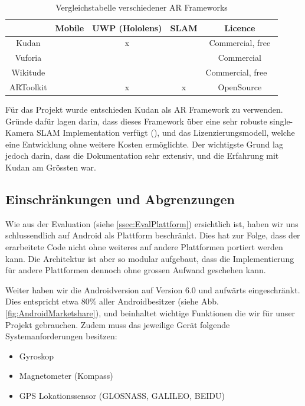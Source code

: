 \documentclass[a4paper]{scrreprt}
\begin{document}
\begin{table}[h!]
	\center
	\begin{tabular}{|c|c|c|c|c|}
		\hline 
		& \textbf{Mobile} & \textbf{UWP (Hololens)} & \textbf{SLAM} & \textbf{Licence} \\ 
		\hline 
		Kudan & \checkmark & x & \checkmark & Commercial, free \\ 
		\hline 
		Vuforia & \checkmark & \checkmark & \checkmark & Commercial \\ 
		\hline 
		Wikitude & \checkmark & \checkmark & \checkmark & Commercial, free \ \\ 
		\hline 
		ARToolkit & \checkmark & x & x & OpenSource \\ 
		\hline 
	\end{tabular}
	\caption{Vergleichstabelle verschiedener AR Frameworks}
\end{table}


Für das Projekt wurde entschieden Kudan als AR Framework zu verwenden. Gründe dafür lagen darin, dass dieses Framework über eine sehr robuste single-Kamera SLAM Implementation verfügt (\cite{BerfinAyhan2017}), und das Lizenzierungsmodell, welche eine Entwicklung ohne weitere Kosten ermöglichte. Der wichtigste Grund lag jedoch darin, dass die Dokumentation sehr extensiv, und die Erfahrung mit Kudan am Grössten war.

\subsection{Einschränkungen und Abgrenzungen}

Wie aus der Evaluation (siehe \ref{ssec:EvalPlattform}) ersichtlich ist, haben wir uns schlussendlich auf Android als Plattform beschränkt. Dies hat zur Folge, dass der erarbeitete Code nicht ohne weiteres auf andere Plattformen portiert werden kann. Die Architektur ist aber so modular aufgebaut, dass die Implementierung für andere Plattformen dennoch ohne grossen Aufwand geschehen kann.

Weiter haben wir die Androidversion auf Version 6.0 und aufwärts eingeschränkt. Dies entspricht etwa 80\% aller Androidbesitzer (siehe Abb. \ref{fig:AndroidMarketshare}), und beinhaltet wichtige Funktionen die wir für unser Projekt gebrauchen. Zudem muss das jeweilige Gerät folgende Systemanforderungen besitzen:
\begin{itemize}
	\item Gyroskop
	\item Magnetometer (Kompass)
	\item GPS Lokationssensor (GLOSNASS, GALILEO, BEIDU)
\end{itemize}
\end{document}
